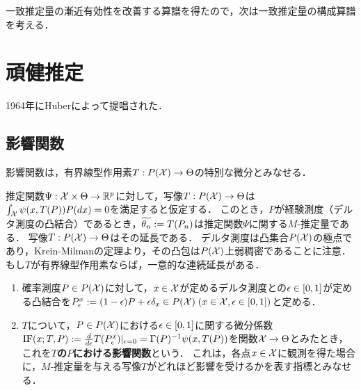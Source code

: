 \documentclass[uplatex,dvipdfmx]{jsreport}
\begin{document}
\begin{tcolorbox}[colframe=ForestGreen, colback=ForestGreen!10!white,breakable,colbacktitle=ForestGreen!40!white,coltitle=black,fonttitle=\bfseries\sffamily,
title=]
    一致推定量の漸近有効性を改善する算譜を得たので，次は一致推定量の構成算譜を考える．
\end{tcolorbox}

\section{頑健推定}

\begin{tcolorbox}[colframe=ForestGreen, colback=ForestGreen!10!white,breakable,colbacktitle=ForestGreen!40!white,coltitle=black,fonttitle=\bfseries\sffamily,
title=]
    1964年にHuberによって提唱された．
\end{tcolorbox}

\subsection{影響関数}

\begin{tcolorbox}[colframe=ForestGreen, colback=ForestGreen!10!white,breakable,colbacktitle=ForestGreen!40!white,coltitle=black,fonttitle=\bfseries\sffamily,
title=]
    影響関数は，有界線型作用素$T:P(\mathcal{X})\to\Theta$の特別な微分とみなせる．
\end{tcolorbox}

\begin{notation}
    推定関数$\Psi:\mathcal{X}\times\Theta\to\mathbb{R}^p$に対して，写像$T:P(\mathcal{X})\to\Theta$は$\int_{\mathcal{X}}\psi(x,T(P))P(dx)=0$を満足すると仮定する．
    このとき，$P$が経験測度（デルタ測度の凸結合）であるとき，$\widetilde{\theta_n}:=T(P_n)$は推定関数$\Psi$に関する$M$-推定量である．
    写像$T:P(\mathcal{X})\to\Theta$はその延長である．
    デルタ測度は凸集合$P(\mathcal{X})$の極点であり，Krein-Milmanの定理より，その凸包は$P(\mathcal{X})$上弱稠密であることに注意．
    もし$T$が有界線型作用素ならば，一意的な連続延長がある．
\end{notation}

\begin{definition}\mbox{}
    \begin{enumerate}
        \item 確率測度$P\in P(\mathcal{X})$に対して，$x\in\mathcal{X}$が定めるデルタ測度との$\epsilon\in[0,1]$が定める凸結合を$P^x_\epsilon:=(1-\epsilon)P+\epsilon\delta_x\in P(\mathcal{X})\;(x\in\mathcal{X},\epsilon\in[0,1])$と定める．
        \item $T$について，$P\in P(\mathcal{X})$における$\epsilon\in[0,1]$に関する微分係数$\mathrm{IF}(x;T,P):=\frac{d }{d \epsilon}T(P^x_\epsilon)|_{\epsilon=0}=\Gamma(P)^{-1}\psi(x,T(P))$を関数$\mathcal{X}\to\Theta$とみたとき，これを\textbf{$T$の$P$における影響関数}という．
        これは，各点$x\in\mathcal{X}$に観測を得た場合に，$M$-推定量を与える写像$T$がどれほど影響を受けるかを表す指標とみなせる．
    \end{enumerate}
\end{definition}
\end{document}
